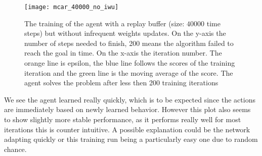\begin{figure}
    \texttt{[image: mcar\_40000\_no\_iwu]}
    \caption{The training of the agent with a replay buffer (size: $40000$ time steps) but without infrequent weights updates. On the y-axis the number of steps needed to finish, 200 means the algorithm failed to reach the goal in time. On the x-axis the iteration number. The orange line is epsilon, the blue line follows the scores of the training iteration and the green line is the moving average of the score. The agent solves the problem after less then 200 training iterations}
    \label{fig:no_iwu}
\end{figure}

We see the agent learned really quickly, which is to be expected since the actions are immediately based on newly learned behavior. However this plot also seems to show slightly more stable performance, as it performs really well for most iterations this is counter intuitive. A possible explanation could be the network adapting quickly or this training run being a particularly easy one due to random chance.